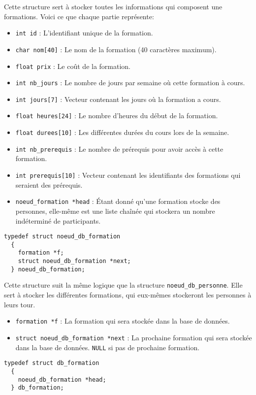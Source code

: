 \documentclass[10pt]{article}
\begin{document}
Cette structure sert à stocker toutes les informations qui composent une formations.
Voici ce que chaque partie représente:
\begin{itemize}
\item \texttt{int id} : L'identifiant unique de la formation.
\item \texttt{char nom[40]} : Le nom de la formation (40 caractères maximum).
\item \texttt{float prix} : Le coût de la formation.
\item \texttt{int nb\_jours} : Le nombre de jours par semaine où cette formation à cours.
\item \texttt{int jours[7]} : Vecteur contenant les jours où la formation a cours.
\item \texttt{float heures[24]} : Le nombre d'heures du début de la formation.
\item \texttt{float durees[10]} : Les différentes durées du cours lors de la semaine.
\item \texttt{int nb\_prerequis} : Le nombre de prérequis pour avoir accès à cette formation.
\item \texttt{int prerequis[10]} : Vecteur contenant les identifiants des formations qui seraient des prérequis.
\item \texttt{noeud\_formation *head} : Étant donné qu'une formation stocke des personnes, elle-même est une liste chaînée qui stockera un nombre indéterminé de participants.
\end{itemize}

\begin{lstlisting}[firstnumber=115]
  typedef struct noeud_db_formation
  {
    formation *f;
    struct noeud_db_formation *next;
  } noeud_db_formation;
\end{lstlisting}

Cette structure suit la même logique que la structure \texttt{noeud\_db\_personne}. Elle sert à stocker les différentes formations, qui eux-mêmes stockeront les personnes à leurs tour.
\begin{itemize}
\item \texttt{formation *f} : La formation qui sera stockée dans la base de données.
\item \texttt{struct noeud\_db\_formation *next} : La prochaine formation qui sera stockée dans la base de données. \texttt{NULL} si pas de prochaine formation.
\end{itemize}

\begin{lstlisting}[firstnumber=127]
  typedef struct db_formation
  {
    noeud_db_formation *head;
  } db_formation;
\end{lstlisting}
\end{document}
